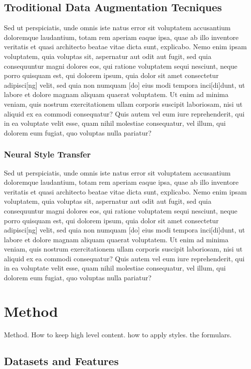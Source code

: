 \documentclass[a4paper,11pt]{article}
\begin{document}
\subsection{Troditional Data Augmentation Tecniques}
Sed ut perspiciatis, unde omnis iste natus error sit voluptatem accusantium doloremque laudantium, totam rem aperiam eaque ipsa, quae ab illo inventore veritatis et quasi architecto beatae vitae dicta sunt, explicabo. Nemo enim ipsam voluptatem, quia voluptas sit, aspernatur aut odit aut fugit, sed quia consequuntur magni dolores eos, qui ratione voluptatem sequi nesciunt, neque porro quisquam est, qui dolorem ipsum, quia dolor sit amet consectetur adipisci[ng] velit, sed quia non numquam [do] eius modi tempora inci[di]dunt, ut labore et dolore magnam aliquam quaerat voluptatem. Ut enim ad minima veniam, quis nostrum exercitationem ullam corporis suscipit laboriosam, nisi ut aliquid ex ea commodi consequatur? Quis autem vel eum iure reprehenderit, qui in ea voluptate velit esse, quam nihil molestiae consequatur, vel illum, qui dolorem eum fugiat, quo voluptas nulla pariatur?

\subsubsection{Neural Style Transfer}
Sed ut perspiciatis, unde omnis iste natus error sit voluptatem accusantium doloremque laudantium, totam rem aperiam eaque ipsa, quae ab illo inventore veritatis et quasi architecto beatae vitae dicta sunt, explicabo. Nemo enim ipsam voluptatem, quia voluptas sit, aspernatur aut odit aut fugit, sed quia consequuntur magni dolores eos, qui ratione voluptatem sequi nesciunt, neque porro quisquam est, qui dolorem ipsum, quia dolor sit amet consectetur adipisci[ng] velit, sed quia non numquam [do] eius modi tempora inci[di]dunt, ut labore et dolore magnam aliquam quaerat voluptatem. Ut enim ad minima veniam, quis nostrum exercitationem ullam corporis suscipit laboriosam, nisi ut aliquid ex ea commodi consequatur? Quis autem vel eum iure reprehenderit, qui in ea voluptate velit esse, quam nihil molestiae consequatur, vel illum, qui dolorem eum fugiat, quo voluptas nulla pariatur?

\section{Method}
Method. How to keep high level content. how to apply styles. the formulars.
\subsection{Datasets and Features} 
\end{document}
